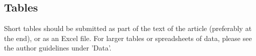\subsection{Tables}
Short tables should be submitted as part of the text of the article (preferably at the end), or as an Excel file.
For larger tables or spreadsheets of data, please see the author guidelines under 'Data'.